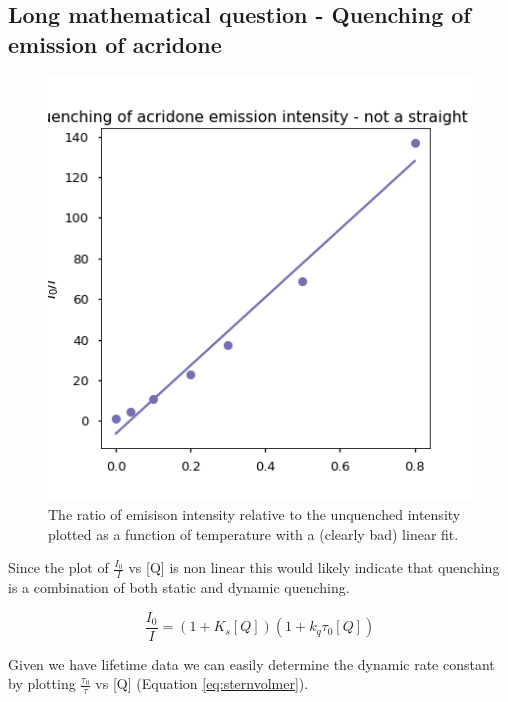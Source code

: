 \documentclass[
]{book}
\begin{document}
\hypertarget{sec:acridoneans}{%
\subsection{Long mathematical question - Quenching of emission of acridone}\label{sec:acridoneans}}

\begin{figure}

{\centering \includegraphics[width=0.7\linewidth]{images/acridonequenchI0I} 

}

\caption{The ratio of emisison intensity  relative to the unquenched intensity plotted as a function of temperature with a (clearly bad) linear fit.}\label{fig:acridoneI0I}
\end{figure}

Since the plot of \(\frac{I_0}{I}\) vs {[}Q{]} is non linear this would likely indicate that quenching is a combination of both static and dynamic quenching.

\begin{equation*}
\frac{I_0}{I}=(1 + K_s [Q])(1 + k_q \tau _0 [Q])
\end{equation*}

Given we have lifetime data we can easily determine the dynamic rate constant by plotting \(\frac{\tau_0}{\tau}\) vs {[}Q{]} (Equation \eqref{eq:sternvolmer}).
\end{document}
